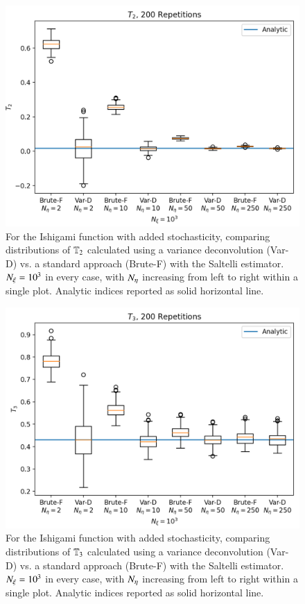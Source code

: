 \begin{figure}[b]
    \centering
    \includegraphics[width=\textwidth]{figures/ishi_t2_boxplot_c5.png}
    \caption{For the Ishigami function with added stochasticity, comparing distributions of $\mathbb{T}_{2}$ calculated using a variance deconvolution (Var-D) vs. a standard approach (Brute-F) with the Saltelli estimator. ${N_\xi}=10^3$ in every case, with ${N_\eta}$ increasing from left to right within a single plot. Analytic indices reported as solid horizontal line.}
    \label{fig:ishigami-t2}
\end{figure}
\begin{figure}[b]
    \centering
    \includegraphics[width=\textwidth]{figures/ishi_t3_boxplot_c5.png}
    \caption{For the Ishigami function with added stochasticity, comparing distributions of $\mathbb{T}_{3}$ calculated using a variance deconvolution (Var-D) vs. a standard approach (Brute-F) with the Saltelli estimator. ${N_\xi}=10^3$ in every case, with ${N_\eta}$ increasing from left to right within a single plot. Analytic indices reported as solid horizontal line.}
    \label{fig:ishigami-t3}
\end{figure}

